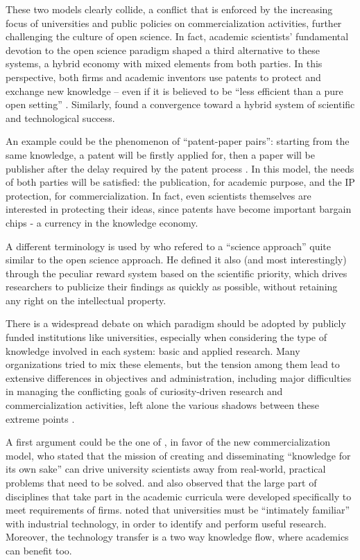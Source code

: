 These two models clearly collide, a conflict that is enforced by the increasing focus of universities and public policies on commercialization activities, further challenging the culture of open science. In fact, academic scientists' fundamental devotion to the open science paradigm shaped a third alternative to these systems, a hybrid economy with mixed elements from both parties. In this perspective, both firms and academic inventors use patents to protect and exchange new knowledge – even if it is believed to be \enquote{less efficient than a pure open setting} \citep{Geuna2009}. Similarly, \citet{OwenSmith2001} found a convergence toward a hybrid system of scientific and technological success.

An example could be the phenomenon of \enquote{patent-paper pairs}: starting from the same knowledge, a patent will be firstly applied for, then a paper will be publisher after the delay required by the patent process \citep{Murray2005}. In this model, the needs of both parties will be satisfied: the publication, for academic purpose, and the IP protection, for commercialization. In fact, even scientists themselves are interested in protecting their ideas, since patents have become important bargain chips - a currency in the knowledge economy.

A different terminology is used by \citet{Stern2004} who refered to a \enquote{science approach} quite similar to the open science approach. He defined it also (and most interestingly) through the peculiar reward system based on the scientific priority, which drives researchers to publicize their findings as quickly as possible, without retaining any right on the intellectual property. 

There is a widespread debate on which paradigm should be adopted by publicly funded institutions like universities, especially when considering the type of knowledge involved in each system: basic and applied research. Many organizations tried to mix these elements, but the tension among them lead to extensive differences in objectives and administration, including major difficulties in managing the conflicting goals of curiosity-driven research and commercialization activities, left alone the various shadows between these extreme points \citep{Rasmussen2006}.

A first argument could be the one of \citet{Geuna2009}, in favor of the new commercialization model, who stated that the mission of creating and disseminating \enquote{knowledge for its own sake} can drive university scientists away from real-world, practical problems that need to be solved. \citet{Rosenberg1994} and \citet{Nelson1998} also observed that the large part of disciplines that take part in the academic curricula were developed specifically to meet requirements of firms. \citet{Balconi2006} noted that universities must be \enquote{intimately familiar} with industrial technology, in order to identify and perform useful research. Moreover, the technology transfer is a two way knowledge flow, where academics can benefit too.

